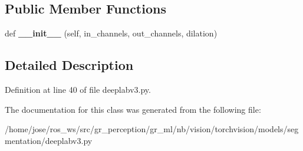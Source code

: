 \subsection*{Public Member Functions}
\begin{DoxyCompactItemize}
\item 
\mbox{\label{classtorchvision_1_1models_1_1segmentation_1_1deeplabv3_1_1ASPPConv_a7b45b9fca8ecd00cc2243417a49467e8}} 
def {\bfseries \+\_\+\+\_\+init\+\_\+\+\_\+} (self, in\+\_\+channels, out\+\_\+channels, dilation)
\end{DoxyCompactItemize}


\subsection{Detailed Description}


Definition at line 40 of file deeplabv3.\+py.



The documentation for this class was generated from the following file\+:\begin{DoxyCompactItemize}
\item 
/home/jose/ros\+\_\+ws/src/gr\+\_\+perception/gr\+\_\+ml/nb/vision/torchvision/models/segmentation/deeplabv3.\+py\end{DoxyCompactItemize}
